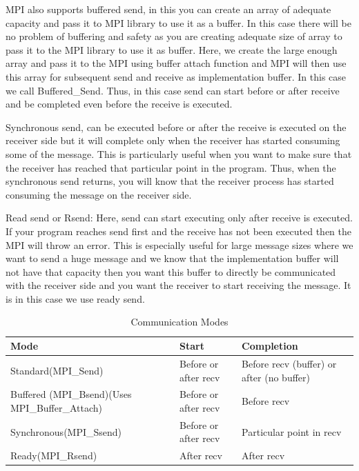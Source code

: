 \documentclass[12pt]{book}
\begin{document}
MPI also supports buffered send, in this you can create an array of adequate capacity and pass it to MPI library to use it as a buffer. In this case there will be no problem of buffering and safety as you are creating adequate size of array to pass it to the MPI library to use it as buffer. Here, we create the large enough array and pass it to the MPI using buffer attach function and MPI will then use this array for subsequent send and receive as implementation buffer. In this case we call Buffered\_Send. Thus, in this case send can start before or after receive and be completed even before the receive is executed.

Synchronous send, can be executed before or after the receive is executed on the receiver side but it will complete only when the receiver has started consuming some of the message. This is particularly useful when you want to make sure that the receiver has reached that particular point in the program. Thus, when the synchronous send returns, you will know that the receiver process has started consuming the message on the receiver side.

Read send or Rsend: Here, send can start executing only after receive is executed. If your program reaches send first and the receive has not been executed then the MPI will throw an error. This is especially useful for large message sizes where we want to send a huge message and we know that the implementation buffer will not have that capacity then you want this buffer to directly be communicated with the receiver side and you want the receiver to start receiving the message. It is in this case we use ready send.


\begin{table}
    \centering
    \begin{tabular}
        {|p{}|p{}|p{}|}    
        \hline
        Mode & Start & Completion \\
        \hline
        Standard(MPI\_Send) & Before or after recv  & Before recv (buffer) or after (no buffer)\\
\hline
        Buffered (MPI\_Bsend)(Uses MPI\_Buffer\_Attach) & Before or after recv & Before recv\\
        \hline
         Synchronous(MPI\_Ssend)&Before or after recv  & Particular point in recv\\
         \hline
         Ready(MPI\_Rsend)& After recv & After recv\\
         \hline
    \end{tabular}
    \caption{Communication Modes}
    \label{tab:comm_modes}
\end{table}
\end{document}
